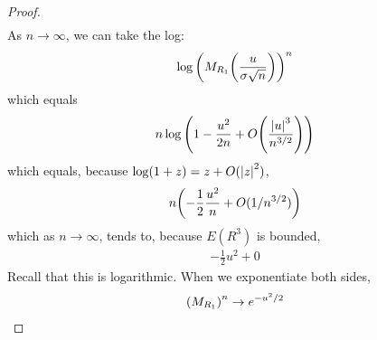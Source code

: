 \begin{proof}
\begin{align*}
\end{align*}
As $n \to \infty$, we can take the log:
\begin{align}
    \log\qty(M_{R_1}\qty(\frac{u}{\sigma \sqrt{n}}))^n
\end{align}
which equals
\begin{align}
    n\log\qty(1 - \frac{u^2}{2n} + O\qty(\frac{\abs{u}^3}{n^{3/2}}))
\end{align}
which equals, because $\log(1 + z) = z + O(\abs{z}^2)$,
\begin{align}
    n \qty(-\frac{1}{2}\frac{u^2}{n} + O(1/n^{3/2}))
\end{align}
    which as $n \to \infty$, tends to, because $E(R^3)$ is bounded,
\begin{align}
    -\frac{1}{2}u^2 + 0
\end{align}
Recall that this is logarithmic. When we exponentiate both sides,
\begin{align}
    \qty(M_{R_1})^n \to e^{-u^2/2}
\end{align}

\end{proof}








